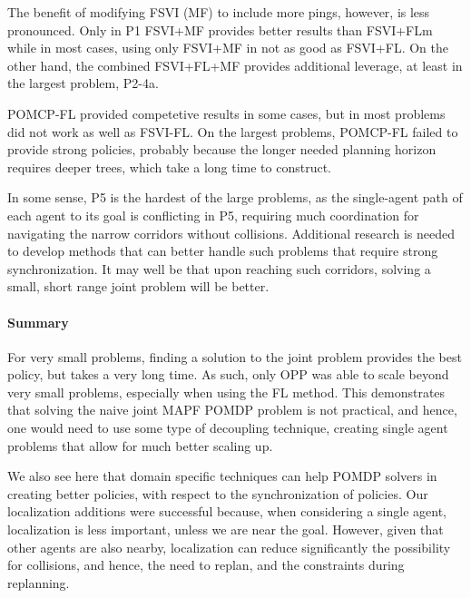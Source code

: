 \documentclass[letterpaper]{article} %
\begin{document}
The benefit of modifying FSVI (MF) to include more pings, however, is less pronounced. Only in P1 FSVI+MF provides better results than FSVI+FLm while in most cases, using only FSVI+MF in not as good as FSVI+FL. On the other hand, the combined FSVI+FL+MF provides additional leverage, at least in the largest problem, P2-4a.

POMCP-FL provided competetive results in some cases, but in most problems did not work as well as FSVI-FL. On the largest problems, POMCP-FL failed to provide strong policies, probably because the longer needed planning horizon requires deeper trees, which take a long time to construct.

In some sense, P5 is the hardest of the large problems, as the single-agent path of each agent to its goal is conflicting in P5, requiring much coordination for navigating the narrow corridors without collisions. 
Additional research is needed to develop methods that can better handle such problems that require strong synchronization. It may well be that upon reaching such corridors, solving a small, short range joint problem will be better.

\paragraph{Summary} For very small problems, finding a solution to the joint problem provides the best policy, but takes a very long time. As such, only OPP was able to scale beyond very small problems, especially when using the FL method. This demonstrates that solving the naive joint MAPF POMDP problem is not practical, and hence, one would need to use some type of decoupling technique, creating single agent problems that allow for much better scaling up.

We also see here that domain specific techniques can help POMDP solvers in creating better policies, with respect to the synchronization of policies. Our localization additions were successful because, when considering a single agent, localization is less important, unless we are near the goal. However, given that other agents are also nearby, localization can reduce significantly the possibility for collisions, and hence, the need to replan, and the constraints during replanning.
\end{document}
